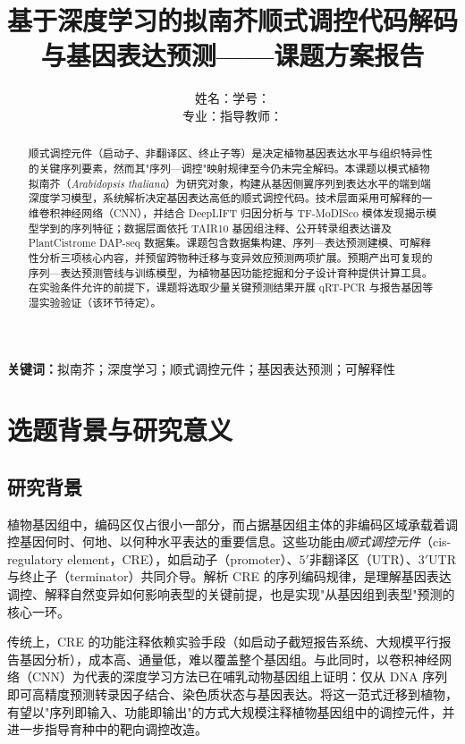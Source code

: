 \documentclass[UTF8,11pt,a4paper]{ctexart}
\title{\textbf{基于深度学习的拟南芥顺式调控代码解码\\与基因表达预测——课题方案报告}}
\author{姓名：\underline{\hspace{2cm}}\quad 学号：\underline{\hspace{2.8cm}}\\[0.4em]
专业：\underline{\hspace{2cm}}\quad 指导教师：\underline{\hspace{2cm}}}
\date{}
\begin{document}
\maketitle

\begin{abstract}
\noindent
顺式调控元件（启动子、非翻译区、终止子等）是决定植物基因表达水平与组织特异性的关键序列要素，然而其"序列—调控"映射规律至今仍未完全解码。本课题以模式植物拟南芥（\emph{Arabidopsis thaliana}）为研究对象，构建从基因侧翼序列到表达水平的端到端深度学习模型，系统解析决定基因表达高低的顺式调控代码。技术层面采用可解释的一维卷积神经网络（CNN），并结合 DeepLIFT 归因分析与 TF-MoDISco 模体发现揭示模型学到的序列特征；数据层面依托 TAIR10 基因组注释、公开转录组表达谱及 PlantCistrome DAP-seq 数据集。课题包含数据集构建、序列—表达预测建模、可解释性分析三项核心内容，并预留跨物种迁移与变异效应预测两项扩展。预期产出可复现的序列—表达预测管线与训练模型，为植物基因功能挖掘和分子设计育种提供计算工具。在实验条件允许的前提下，课题将选取少量关键预测结果开展 qRT-PCR 与报告基因等湿实验验证（该环节待定）。
\end{abstract}

\vspace{0.5em}
\noindent\textbf{关键词：}拟南芥；深度学习；顺式调控元件；基因表达预测；可解释性

\tableofcontents
\newpage

\section{选题背景与研究意义}
\label{sec:intro}

\subsection{研究背景}
\label{sec:intro-bg}

植物基因组中，编码区仅占很小一部分，而占据基因组主体的非编码区域承载着调控基因何时、何地、以何种水平表达的重要信息。这些功能由\emph{顺式调控元件}（cis-regulatory element，CRE），如启动子（promoter）、$5'$非翻译区（UTR）、$3'$UTR 与终止子（terminator）共同介导。解析 CRE 的序列编码规律，是理解基因表达调控、解释自然变异如何影响表型的关键前提，也是实现"从基因组到表型"预测的核心一环\cite{marand2023}。

传统上，CRE 的功能注释依赖实验手段（如启动子截短报告系统、大规模平行报告基因分析），成本高、通量低，难以覆盖整个基因组。与此同时，以卷积神经网络（CNN）为代表的深度学习方法已在哺乳动物基因组上证明：仅从 DNA 序列即可高精度预测转录因子结合、染色质状态与基因表达\cite{zhou2015,avsec2021}。将这一范式迁移到植物，有望以"序列即输入、功能即输出"的方式大规模注释植物基因组中的调控元件，并进一步指导育种中的靶向调控改造。
\end{document}
